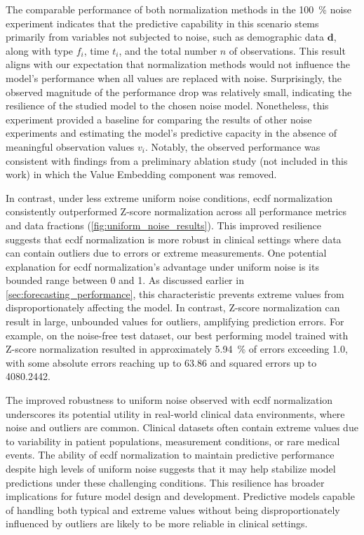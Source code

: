 The comparable performance of both normalization methods in the \qty{100}{\percent} noise experiment indicates that the predictive capability in this scenario stems primarily from variables not subjected to noise, such as demographic data \(\mathbf{d}\), along with type \(f_i\), time \(t_i\), and the total number \(n\) of observations. This result aligns with our expectation that normalization methods would not influence the model's performance when all values are replaced with noise. Surprisingly, the observed magnitude of the performance drop was relatively small, indicating the resilience of the studied model to the chosen noise model. Nonetheless, this experiment provided a baseline for comparing the results of other noise experiments and estimating the model's predictive capacity in the absence of meaningful observation values \(v_i\). Notably, the observed performance was consistent with findings from a preliminary ablation study (not included in this work) in which the Value Embedding component was removed.


In contrast, under less extreme uniform noise conditions, \gls{ecdf} normalization consistently outperformed Z-score normalization across all performance metrics and data fractions (\cref{fig:uniform_noise_results}). This improved resilience suggests that \gls{ecdf} normalization is more robust in clinical settings where data can contain outliers due to errors or extreme measurements. One potential explanation for \gls{ecdf} normalization's advantage under uniform noise is its bounded range between \num{0} and \num{1}. As discussed earlier in \cref{sec:forecasting_performance}, this characteristic prevents extreme values from disproportionately affecting the model. In contrast, Z-score normalization can result in large, unbounded values for outliers, amplifying prediction errors. For example, on the noise-free test dataset, our best performing model trained with Z-score normalization resulted in approximately \qty{5.94}{\percent} of errors exceeding \num{1.0}, with some absolute errors reaching up to \num{63.86} and squared errors up to \num{4080.2442}.

The improved robustness to uniform noise observed with \gls{ecdf} normalization underscores its potential utility in real-world clinical data environments, where noise and outliers are common. Clinical datasets often contain extreme values due to variability in patient populations, measurement conditions, or rare medical events. The ability of \gls{ecdf} normalization to maintain predictive performance despite high levels of uniform noise suggests that it may help stabilize model predictions under these challenging conditions. This resilience has broader implications for future model design and development. Predictive models capable of handling both typical and extreme values without being disproportionately influenced by outliers are likely to be more reliable in clinical settings.

